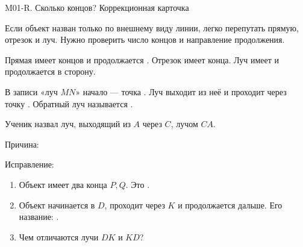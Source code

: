 \worksheettitle
  {M01-R. Сколько концов?}
  { Коррекционная карточка}

\studentnameblock

\begin{warningbox}
  Если объект назван только по внешнему виду линии, легко перепутать прямую,
  отрезок и луч. Нужно проверить число концов и направление продолжения.
\end{warningbox}

\begin{practicebox}
  Прямая имеет \answerblank[18mm] концов и продолжается
  \answerblank[35mm]. Отрезок имеет \answerblank[18mm] конца. Луч имеет
  \answerblank[28mm] и продолжается в \answerblank[28mm] сторону.
\end{practicebox}

\begin{practicebox}
  В записи «луч $MN$» начало — точка \answerblank[15mm]. Луч выходит из
  неё и проходит через точку \answerblank[15mm]. Обратный луч называется
  \answerblank[22mm].
\end{practicebox}

\begin{practicebox}
  Ученик назвал луч, выходящий из $A$ через $C$, лучом $CA$.

  Причина: \answerblank[85mm]

  Исправление: \answerblank[55mm]
\end{practicebox}

\begin{checkpointbox}
  \begin{enumerate}[label=\textbf{\arabic*.}]
    \item Объект имеет два конца $P,Q$. Это \answerblank[25mm].
    \item Объект начинается в $D$, проходит через $K$ и продолжается
      дальше. Его название: \answerblank[25mm].
    \item Чем отличаются лучи $DK$ и $KD$? 
  \end{enumerate}
\end{checkpointbox}
